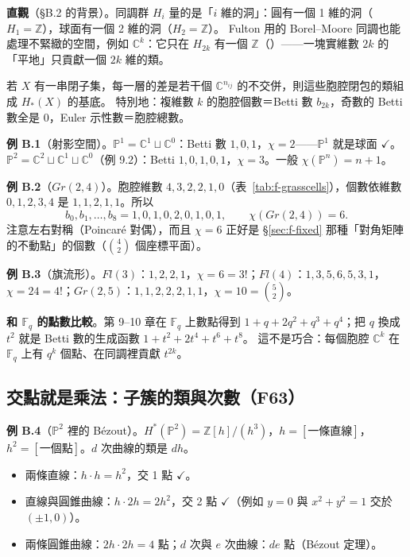 \textbf{直觀}（\S B.2 的背景）。同調群 $H_i$ 量的是「$i$ 維的洞」：圓有一個 1 維的洞（$H_1=\mathbb Z$），球面有一個 2 維的洞（$H_2=\mathbb Z$）。
Fulton 用的 Borel--Moore 同調也能處理不緊緻的空間，例如 $\mathbb C^k$：它只在 $H_{2k}$ 有一個 $\mathbb Z$（）——一塊實維數 $2k$ 的「平地」只貢獻一個 $2k$ 維的類。

\begin{thmbox}
若 $X$ 有一串閉子集，每一層的差是若干個 $\mathbb C^{n_{ij}}$ 的不交併，則這些胞腔閉包的類組成 $H_*(X)$ 的基底。
特別地：複維數 $k$ 的胞腔個數＝Betti 數 $b_{2k}$，奇數的 Betti 數全是 0，Euler 示性數＝胞腔總數。
\end{thmbox}

\textbf{例 B.1}（射影空間）。$\mathbb P^1=\mathbb C^1\sqcup\mathbb C^0$：Betti 數 $1,0,1$，$\chi=2$——$\mathbb P^1$ 就是球面 $\checkmark$。
$\mathbb P^2=\mathbb C^2\sqcup\mathbb C^1\sqcup\mathbb C^0$（例 9.2）：Betti $1,0,1,0,1$，$\chi=3$。一般 $\chi(\mathbb P^n)=n+1$。

\textbf{例 B.2}（$Gr(2,4)$）。胞腔維數 $4,3,2,2,1,0$（表~\ref{tab:f-grasscells}），個數依維數 $0,1,2,3,4$ 是 $1,1,2,1,1$。所以
\[
b_0,b_1,\dots,b_8=1,0,1,0,2,0,1,0,1,\qquad \chi(Gr(2,4))=6 .
\]
注意左右對稱（Poincaré 對偶），而且 $\chi=6$ 正好是 \S\ref{sec:f-fixed} 那種「對角矩陣的不動點」的個數（$\binom42$ 個座標平面）。

\textbf{例 B.3}（旗流形）。$Fl(3)$：$1,2,2,1$，$\chi=6=3!$；$Fl(4)$：$1,3,5,6,5,3,1$，$\chi=24=4!$；$Gr(2,5)$：$1,1,2,2,2,1,1$，$\chi=10=\binom52$。

\textbf{和 $\mathbb F_q$ 的點數比較}。第 9--10 章在 $\mathbb F_q$ 上數點得到 $1+q+2q^2+q^3+q^4$；把 $q$ 換成 $t^2$ 就是 Betti 數的生成函數 $1+t^2+2t^4+t^6+t^8$。
這不是巧合：每個胞腔 $\mathbb C^k$ 在 $\mathbb F_q$ 上有 $q^k$ 個點、在同調裡貢獻 $t^{2k}$。

\subsection{交點就是乘法：子簇的類與次數（F63）}\label{sec:f-classes}

\textbf{例 B.4}（$\mathbb P^2$ 裡的 Bézout）。$H^*(\mathbb P^2)=\mathbb Z[h]/(h^3)$，$h=[\text{一條直線}]$，$h^2=[\text{一個點}]$。$d$ 次曲線的類是 $dh$。
\begin{itemize}[nosep]
\item 兩條直線：$h\cdot h=h^2$，交 1 點 $\checkmark$。
\item 直線與圓錐曲線：$h\cdot2h=2h^2$，交 2 點 $\checkmark$（例如 $y=0$ 與 $x^2+y^2=1$ 交於 $(\pm1,0)$）。
\item 兩條圓錐曲線：$2h\cdot2h=4$ 點；$d$ 次與 $e$ 次曲線：$de$ 點（Bézout 定理）。
\end{itemize}

